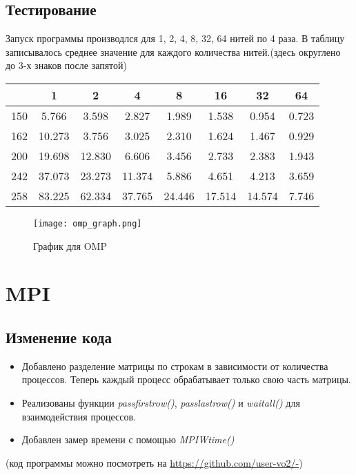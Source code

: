 \documentclass[a4paper,12pt,titlepage,final]{article}
\begin{document}
\subsection{Тестирование}
Запуск программы производлся для 1, 2, 4, 8, 32, 64 нитей по 4 раза. В таблицу записывалось среднее значение для каждого количества нитей.(здесь округлено до 3-х знаков после запятой)\par
\begin{tabular}{|c|c|c|c|c|c|c|c|}
\hline
	& 1 &	2 &	4 &	8 &	16 & 32 & 64\\
    \hline
150 &	5.766 & 3.598 & 2.827 &	1.989 &	1.538 &	0.954 &	0.723\\
    \hline
162 &	10.273 &	3.756 &	3.025 &	2.310 &	1.624 &	1.467 &	0.929\\
    \hline
200 &	19.698 &	12.830 &	6.606 &	3.456 &	2.733 &	2.383 &	1.943\\
    \hline
242 &	37.073 &	23.273 &	11.374 &	5.886 &	4.651 &	4.213 &	3.659\\
    \hline
258 &	83.225 &	62.334 &	37.765 &	24.446 &	17.514 &	14.574 &	7.746\\
    \hline
\end{tabular}
\par

\begin{figure}[h!]
  \texttt{[image: omp\_graph.png]}
  \caption{График для OMP}
  \label{fig:omp_graph}
\end{figure}
\newpage

\section{MPI}
\subsection{Изменение кода}
\begin{itemize}
\item Добавлено разделение матрицы по строкам в зависимости от количества процессов. Теперь каждый процесс обрабатывает только свою часть матрицы.
\item Реализованы функции \textit{pass\textunderscore first\textunderscore row()}, \textit{pass\textunderscore last\textunderscore row()} и \textit{wait\textunderscore all()} для взаимодействия процессов.
\item Добавлен замер времени с помощью \textit{MPI\textunderscore Wtime()}
\end{itemize}
(код программы можно посмотреть на \url{https://github.com/user-vo2/-})
\end{document}
